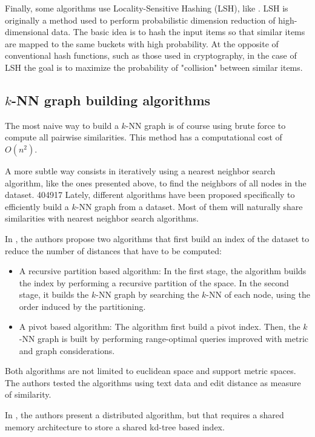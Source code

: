 \documentclass[wcp]{jmlr}
\begin{document}
Finally, some algorithms use Locality-Sensitive Hashing (LSH), like \cite{Rajaraman2010}. LSH is originally a method used to perform probabilistic dimension reduction of high-dimensional data. The basic idea is to hash the input items so that similar items are mapped to the same buckets with high probability. At the opposite of conventional hash functions, such as those used in cryptography, in the case of LSH the goal is to maximize the probability of "collision" between similar items.

\subsection{$k$-NN graph building algorithms}

The most naive way to build a $k$-NN graph is of course using brute force to compute all pairwise similarities. This method has a computational cost of $O(n^2)$.

A more subtle way consists in iteratively using a nearest neighbor search algorithm, like the ones presented above, to find the neighbors of all nodes in the dataset.
404917
Lately, different algorithms have been proposed specifically to efficiently build a $k$-NN graph from a dataset. Most of them will naturally share similarities with nearest neighbor search algorithms.

In \cite{Paredes2006}, the authors propose two algorithms that first build an index of the dataset to reduce the number of distances that have to be computed:

\begin{itemize}
	\item A recursive partition based algorithm: In the first stage, the algorithm builds the index by performing a recursive partition of the space. In the second stage, it builds the $k$-NN graph by searching the $k$-NN of each node, using the order induced by the partitioning.
	\item A pivot based algorithm: The algorithm first build a pivot index. Then, the $k$-NN graph is built by performing range-optimal queries improved with metric and graph considerations.
\end{itemize}

Both algorithms are not limited to euclidean space and support metric spaces. The authors tested the algorithms using text data and edit distance as measure of similarity.

In \cite{Connor2009}, the authors present a distributed algorithm, but that requires a shared memory architecture to store a shared kd-tree based index.
\end{document}
